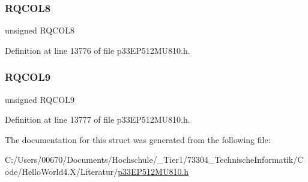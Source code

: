 \subsubsection{\texorpdfstring{R\+Q\+C\+O\+L8}{RQCOL8}}
{\footnotesize\ttfamily unsigned R\+Q\+C\+O\+L8}



Definition at line 13776 of file p33\+E\+P512\+M\+U810.\+h.

\mbox{\label{structtag_d_m_a_r_q_c_b_i_t_s_ad54e518a108da080cc516ee1a70769f3}} 
\subsubsection{\texorpdfstring{R\+Q\+C\+O\+L9}{RQCOL9}}
{\footnotesize\ttfamily unsigned R\+Q\+C\+O\+L9}



Definition at line 13777 of file p33\+E\+P512\+M\+U810.\+h.



The documentation for this struct was generated from the following file\+:\begin{DoxyCompactItemize}
\item 
C\+:/\+Users/00670/\+Documents/\+Hochschule/\+\_\+\+Tier1/73304\+\_\+\+Technische\+Informatik/\+Code/\+Hello\+World4.\+X/\+Literatur/\hyperlink{p33_e_p512_m_u810_8h}{p33\+E\+P512\+M\+U810.\+h}\end{DoxyCompactItemize}
